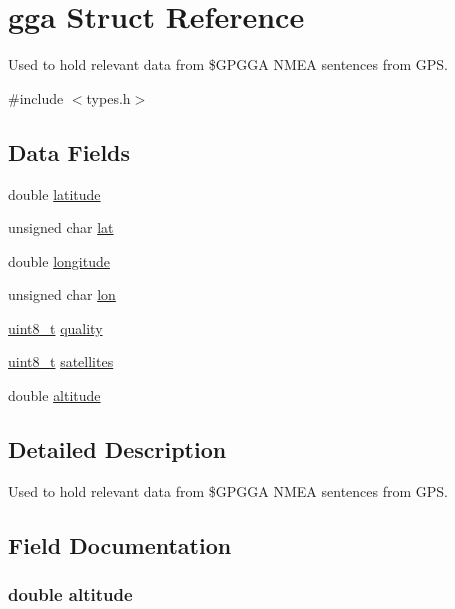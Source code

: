 \hypertarget{structgga}{}\section{gga Struct Reference}
\label{structgga}


Used to hold relevant data from \$\+G\+P\+G\+GA N\+M\+EA sentences from G\+PS.  




{\ttfamily \#include $<$types.\+h$>$}

\subsection*{Data Fields}
\begin{DoxyCompactItemize}
\item 
double \hyperlink{structgga_a76714bdbc5c536fa77dfb14533ff82a9}{latitude}
\item 
unsigned char \hyperlink{structgga_a6a2e4ad53afd61fcd716002fc2965220}{lat}
\item 
double \hyperlink{structgga_ac155e35fdeebafc89723a51520fb9fe6}{longitude}
\item 
unsigned char \hyperlink{structgga_a7e55b80071251dcef4239e60122980a4}{lon}
\item 
\hyperlink{types_8h_aba7bc1797add20fe3efdf37ced1182c5}{uint8\+\_\+t} \hyperlink{structgga_a0b48c8041be823080e6346c1731a54ed}{quality}
\item 
\hyperlink{types_8h_aba7bc1797add20fe3efdf37ced1182c5}{uint8\+\_\+t} \hyperlink{structgga_aa306fbda3e6f642c3668c299361d25d0}{satellites}
\item 
double \hyperlink{structgga_a2b13d276aee0d9fd646c8fa3647e869b}{altitude}
\end{DoxyCompactItemize}


\subsection{Detailed Description}
Used to hold relevant data from \$\+G\+P\+G\+GA N\+M\+EA sentences from G\+PS. 

\subsection{Field Documentation}
\subsubsection[{\texorpdfstring{altitude}{altitude}}]{\setlength{\rightskip}{0pt plus 5cm}double altitude}\hypertarget{structgga_a2b13d276aee0d9fd646c8fa3647e869b}{}\label{structgga_a2b13d276aee0d9fd646c8fa3647e869b}
